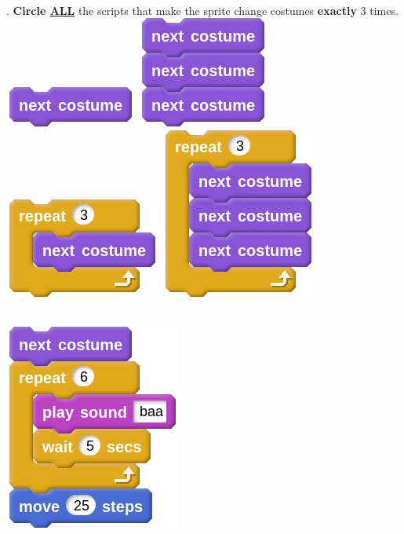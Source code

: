 \documentclass[letterpaper,12pt]{article}
\begin{document}
\noindent \dotfill \\

. \textbf{Circle \underline{ALL}} the scripts that make the sprite change costumes \textbf{exactly} 3 times. \\

\includegraphics[scale=.4,valign=t]{q3_script0.png} \hspace{1.5cm}
\includegraphics[scale=.4,valign=t]{q3_script1.png} \hspace{1.5cm}
\includegraphics[scale=.4,valign=t]{q3_script2.png} \hspace{1.5cm}
\includegraphics[scale=.4,valign=t]{q3_script3.png} \hspace{1.5cm} \\


\noindent \dotfill \\

\begin{center}
\includegraphics[scale=.4]{q4_script0.png}
\end{center}
\end{document}
